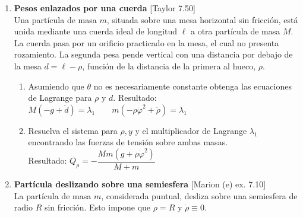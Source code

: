 \documentclass[11pt, spanish, a4paper, twoside]{article}
\begin{document}
\begin{enumerate}

	\item
	\begin{minipage}[t][7.5cm]{0.65\textwidth}
		\textbf{Pesos enlazados por una cuerda} [Taylor 7.50]\\
		Una partícula de masa \(m\), situada sobre una mesa horizontal sin fricción, está unida mediante una cuerda ideal de longitud \(\ell\) a otra partícula de masa \(M\).
		La cuerda pasa por un orificio practicado en la mesa, el cual no presenta rozamiento.
		La segunda pesa pende vertical con una distancia por debajo de la mesa \(d = \ell - \rho\), función de la distancia de la primera al hueco, \(\rho\).
		\begin{enumerate}
			\item Asumiendo que \(\theta\) no es necesariamente constante obtenga las ecuaciones de Lagrange para \(\rho\) y \(d\). Resultado:\\[5 pt]
			\(M \left(- g + \ddot{d}\right) = \lambda_{1} \qquad m \left(- \rho \dot{\varphi}^{2} + \ddot{\rho}\right) = \lambda_{1}\)
			\item Resuelva el sistema para \(\rho, y\) y el multiplicador de Lagrange \(\lambda_1\) encontrando las fuerzas de tensión sobre ambas masas.\\[5 pt]
			Resultado: \(Q_{\rho} = - \dfrac{M m \left(g + \rho \dot{\varphi}^{2}\right)}{M + m}\)
		\end{enumerate}
	\end{minipage}
	\begin{minipage}[c][-1cm][t]{0.3\textwidth}
		
	\end{minipage}


	\item
	\begin{minipage}[t][4.5cm]{0.62\textwidth}
		\textbf{Partícula deslizando sobre una semiesfera} [Marion (e) ex. 7.10]\\
		La partícula de masa \(m\), considerada puntual, desliza sobre una semiesfera de radio \(R\) sin fricción.
		Esto impone que \(\rho = R\) y \(\dot{\rho} \equiv 0\).


\end{minipage}
\end{enumerate}
\end{document}
